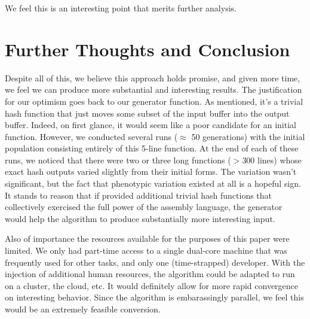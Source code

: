 \documentclass{article}
\begin{document}
We feel this is an interesting point that merits further analysis.

\section{Further Thoughts and Conclusion}
Despite all of this, we believe this approach holds promise, and given more time, we feel we can produce more substantial and interesting results. The justification for our optimism goes back to our generator function. As mentioned, it's a trivial hash function that just moves some subset of the input buffer into the output buffer. Indeed, on first glance, it would seem like a poor candidate for an initial function. However, we conducted several runs ($\approx$ 50 generations) with the initial population consisting entirely of this 5-line function. At the end of each of these runs, we noticed that there were two or three long functions ($>$300 lines) whose exact hash outputs varied slightly from their initial forms. The variation wasn't significant, but the fact that phenotypic variation existed at all is a hopeful sign. It stands to reason that if provided additional trivial hash functions that collectively exercised the full power of the assembly language, the generator would help the algorithm to produce substantially more interesting input.

Also of importance the resources available for the purposes of this paper were limited. We only had part-time access to a single dual-core machine that was frequently used for other tasks, and only one (time-strapped) developer.  With the injection of additional human resources, the algorithm could be adapted to run on a cluster, the cloud, etc. It would definitely allow for more rapid convergence on interesting behavior. Since the algorithm is embarassingly parallel, we feel this would be an extremely feasible conversion.

\end{document}
